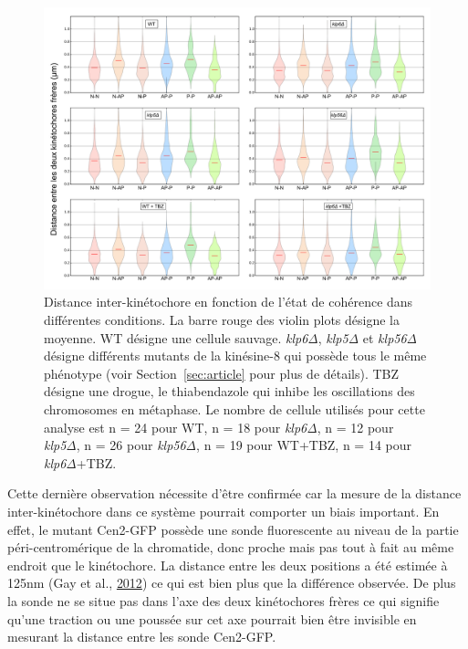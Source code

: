 \documentclass[12pt,a4paper,twoside,openright]{book}
\begin{document}
\begin{figure}[htbp]
\centering
\includegraphics{figures/results/imaging/coherence_stretch.png}
\caption[Distance inter-kinétochore en fonction de l'état de cohérence dans différentes conditions]{\label{fig:coherence_stretch}Distance
inter-kinétochore en fonction de l'état de cohérence dans différentes
conditions. La barre rouge des violin plots désigne la moyenne. WT
désigne une cellule sauvage. \emph{klp6Δ}, \emph{klp5Δ} et \emph{klp56Δ}
désigne différents mutants de la kinésine-8 qui possède tous le même
phénotype (voir Section~\ref{sec:article} pour plus de détails). TBZ
désigne une drogue, le thiabendazole qui inhibe les oscillations des
chromosomes en métaphase. Le nombre de cellule utilisés pour cette
analyse est n = 24 pour WT, n = 18 pour \emph{klp6Δ}, n = 12 pour
\emph{klp5Δ}, n = 26 pour \emph{klp56Δ}, n = 19 pour WT+TBZ, n = 14 pour
\emph{klp6Δ}+TBZ.}
\end{figure}

Cette dernière observation nécessite d'être confirmée car la mesure de
la distance inter-kinétochore dans ce système pourrait comporter un
biais important. En effet, le mutant Cen2-GFP possède une sonde
fluorescente au niveau de la partie péri-centromérique de la chromatide,
donc proche mais pas tout à fait au même endroit que le kinétochore. La
distance entre les deux positions a été estimée à 125nm (Gay et al.,
\hyperref[ref-Gay2012a]{2012}) ce qui est bien plus que la différence
observée. De plus la sonde ne se situe pas dans l'axe des deux
kinétochores frères ce qui signifie qu'une traction ou une poussée sur
cet axe pourrait bien être invisible en mesurant la distance entre les
sonde Cen2-GFP.
\end{document}
